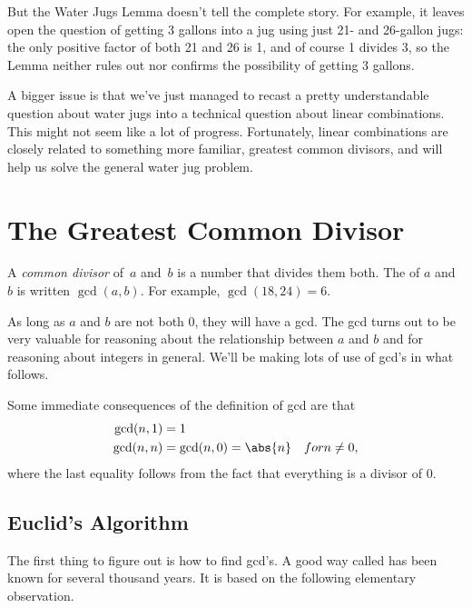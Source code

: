 But the Water Jugs Lemma doesn't tell the complete story.  For
example, it leaves open the question of getting 3 gallons into a jug
using just 21- and 26-gallon jugs: the only positive factor of both 21
and 26 is 1, and of course 1 divides 3, so the Lemma neither rules out
nor confirms the possibility of getting 3 gallons.

A bigger issue is that we've just managed to recast a pretty
understandable question about water jugs into a technical question
about linear combinations.  This might not seem like a lot of
progress.  Fortunately, linear combinations are closely related to
something more familiar, greatest common divisors, and
will help us solve the general water jug problem.

\begin{problems}
\practiceproblems
{}

\classproblems
{}

\end{problems}

\section{The Greatest Common Divisor}\label{sec:gcd}

A \emph{common divisor} of~$a$ and~$b$ is a number that divides them
both.  The  of $a$ and~$b$ is written%
$\gcd(a, b)$.  For example, $\gcd(18, 24) = 6$.

As long as $a$ and $b$ are not both 0, they will have a gcd.  The gcd
turns out to be very valuable for reasoning about the relationship
between $a$ and $b$ and for reasoning about integers in general.
We'll be making lots of use of gcd's in what follows.

Some immediate consequences of the definition of gcd are that
\begin{align*}
\gcd(n, 1) & = 1\\
\gcd(n, n) & = \gcd(n,0) = \abs{n} & {for } n \neq 0,
\end{align*}
where the last equality follows from the fact that everything is a
divisor of 0.

\subsection{Euclid's Algorithm}\label{sec: Euclid}
The first thing to figure out is how to find gcd's.  A good way called  has been known for several thousand years.  It is based on the following
elementary observation.

